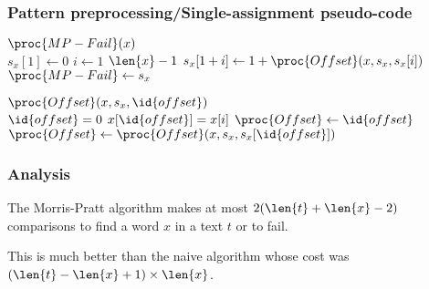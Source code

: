 %
\begin{frame}
\frametitle{Pattern preprocessing/Single-assignment pseudo-code}

\begin{codebox}
\(\proc{MP-Fail}(x)\)\\
\li \(s_{x}[1] \gets 0\)
\li \For \(i \gets 1\) \To \(\len{x}-1\)
\li \Do \(s_{x}[1 + i] \gets 1 + \proc{Offset} (x, s_{x}, s_{x}[i])\)
    \End
\li \(\proc{MP-Fail} \gets s_{x}\)
\end{codebox}
\begin{codebox}
\(\proc{Offset} (x, s_{x}, \id{offset})\)\\
\li \If \(\id{offset} = 0\) \LogOr \(x[\id{offset}] = x[i]\)
\li \Then \(\proc{Offset} \gets \id{offset}\)
\li \Else \(\proc{Offset} \gets \proc{Offset} (x, s_{x}, 
                                               s_{x}[\id{offset}])\)
    \End
\end{codebox}

\end{frame}

%
\begin{frame}
\frametitle{Analysis}

The Morris-Pratt algorithm makes at most \(2 (\len{t} + \len{x} - 2)\)
comparisons to find a word \(x\) in a text \(t\) or to fail.

\bigskip

This is much better than the naive algorithm whose cost was \((\len{t}
- \len{x} + 1) \times \len{x}\).

\end{frame}
